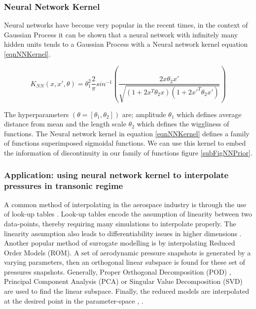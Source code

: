 \subsubsection{Neural Network Kernel}\label{subsubsec:nnkernel}
Neural networks have become very popular in the recent times, in the context of Gaussian Process it can be shown that a neural network with infinitely many hidden units tends to a Gaussian Process with a Neural network kernel \cite{neal2012bayesian} \cite{wilson2014covariance} equation \ref{eqnNNKernel}.

\begin{equation}\label{eqnNNKernel}
K_{NN}(x, x', \theta) = \theta_{1}^{2}\frac{2}{\pi} sin^{-1}\left ( \frac{2x\theta_{2}x'}{\sqrt{(1+2x^{T}\theta_{2}x)(1+2x'^{T}\theta_{2}x')}} \right )
\end{equation}

The hyperparameters \((\theta = [\theta_{1}, \theta_{2}])\) are; amplitude \(\theta_{1}\) which defines average distance from mean and the length scale \(\theta_{2}\) which defines the wiggliness of functions. The Neural network kernel in equation \ref{eqnNNKernel} defines a family of functions superimposed sigmoidal functions. We can use this kernel to embed the information of discontinuity in our family of functions figure \ref{subFigNNPrior}. 

\subsubsection{Application: using neural network kernel to interpolate pressures in transonic regime}
A common method of interpolating in the aerospace industry is through the use of look-up tables \cite{ghoreyshi2009accelerating}. Look-up tables encode the assumption of linearity between two data-points, thereby requiring many simulations to interpolate properly. The linearity assumption also leads to differentiability issues in higher dimensions \cite{campbell2003history}. Another popular method of surrogate modelling is by interpolating Reduced Order Models (ROM). A set of aerodynamic pressure snapshots is generated by a varying parameters, then an orthogonal linear subspace is found for these set of pressures snapshots. Generally, Proper Orthogonal Decomposition (POD) \cite{tan2003proper}, Principal Component Analysis (PCA) \cite{rosenbaum2013efficient} or Singular Value Decomposition (SVD) \cite{braconnier2011towards} are used to find the linear subspace. Finally, the reduced models are interpolated at the desired point in the parameter-space \cite{beckert2001multivariate}, \cite{barrault2004empirical}. 

